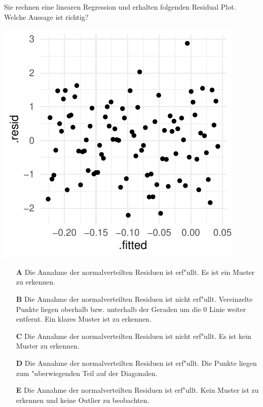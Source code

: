 \documentclass[a4paper, 10pt]{scrartcl}\usepackage[]{graphicx}\usepackage[]{xcolor}
\makeatletter
\def\maxwidth{ %
  \ifdim\Gin@nat@width>\linewidth
    \linewidth
  \else
    \Gin@nat@width
  \fi
}
\makeatother
\begin{document}
Sie rechnen eine linearen Regression und erhalten folgenden Residual
Plot. Welche Aussage ist richtig?




{\centering \includegraphics[width=\maxwidth]{img/mc-regression-06-a-1} 

}







\begin{enumerate}
\item [\textbf{A} \msquare] Die Annahme der normalverteilten Residuen ist erf{"u}llt. Es ist ein Muster zu erkennen.
\item [\textbf{B} \msquare] Die Annahme der normalverteilten Residuen ist nicht erf{"u}llt. Vereinzelte Punkte liegen oberhalb bzw. unterhalb der Geraden um die 0 Linie weiter entfernt. Ein klares Muster ist zu erkennen.
\item [\textbf{C} \msquare] Die Annahme der normalverteilten Residuen ist nicht erf{"u}llt. Es ist kein Muster zu erkennen.
\item [\textbf{D} \msquare] Die Annahme der normalverteilten Residuen ist erf{"u}llt. Die Punkte liegen zum {"u}berwiegenden Teil auf der Diagonalen.
\item [\textbf{E} \msquare] Die Annahme der normalverteilten Residuen ist erf{"u}llt. Kein Muster ist zu erkennen und keine Outlier zu beobachten.
\end{enumerate}
\end{document}

